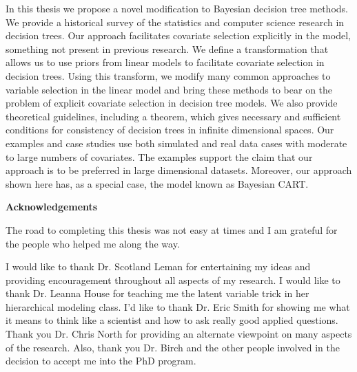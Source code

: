 \documentclass[12pt]{report}
\begin{document}
In this thesis we propose a novel modification to Bayesian decision tree methods. We provide a historical survey of the statistics and computer science research in decision trees. Our approach facilitates covariate selection explicitly in the model, something not present in previous research. We define a transformation that allows us to use priors from linear models to facilitate covariate selection in decision trees. Using this transform, we modify many common approaches to variable selection in the linear model and bring these methods to bear on the problem of explicit covariate selection in decision tree models. We also provide theoretical guidelines, including a theorem, which gives necessary and sufficient conditions for consistency of decision trees in infinite dimensional spaces. Our examples and case studies use both simulated and real data cases with moderate to large numbers of covariates. The examples support the claim that our approach is to be preferred in large dimensional datasets. Moreover, our approach shown here has, as a special case, the model known as Bayesian CART.    



\pagebreak 

{\large \textbf{Acknowledgements}
}

The road to completing this thesis was not easy at times and I am grateful for the people who helped me along the way. 

I would like to thank Dr. Scotland Leman for entertaining my ideas and providing encouragement throughout all aspects of my research. I would like to thank Dr. Leanna House for teaching me the latent variable trick in her hierarchical modeling class. I'd like to thank Dr. Eric Smith for showing me what it means to think like a scientist and how to ask really good applied questions. Thank you Dr. Chris North for providing an alternate viewpoint on many aspects of the research. Also, thank you Dr. Birch and the other people involved in the decision to accept me into the PhD program. 
\end{document}
